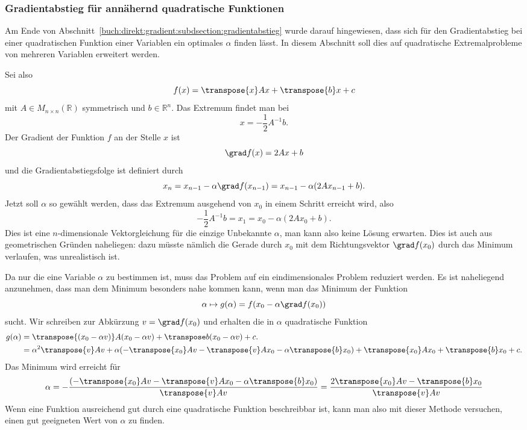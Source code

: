 %
%
\subsubsection{Gradientabstieg für annähernd quadratische Funktionen}
Am Ende von Abschnitt~\ref{buch:direkt:gradient:subdsection:gradientabstieg}
wurde darauf hingewiesen, dass sich für den Gradientabstieg bei einer
quadratischen Funktion einer Variablen ein optimales $\alpha$ finden lässt.
In diesem Abschnitt soll dies auf quadratische Extremalprobleme von
mehreren Variablen erweitert werden.

Sei also
\[
f(x)
=
\transpose{x}Ax+\transpose{b}x+c
\]
mit $A\in M_{n\times n}(\mathbb{R})$ symmetrisch und $b\in\mathbb{R}^n$.
Das Extremum findet man bei 
\[
x = -\frac12 A^{-1} b.
\]
Der Gradient der Funktion $f$ an der Stelle $x$ ist
\[
\grad f(x)
=
2Ax + b
\]
und die Gradientabstiegsfolge ist definiert durch
\[
x_n
=
x_{n-1} -\alpha \grad f(x_{n-1})
=
x_{n-1} - \alpha (2A x_{n-1} + b).
\]
Jetzt soll $\alpha$ so gewählt werden, dass das Extremum ausgehend von 
$x_0$ in einem Schritt erreicht wird, also
\[
-\frac12 A^{-1}b
=
x_1
=
x_0 - \alpha (2A x_0 + b).
\]
Dies ist eine $n$-dimensionale Vektorgleichung für die einzige Unbekannte
$\alpha$, man kann also keine Lösung erwarten.
Dies ist auch aus geometrischen Gründen naheliegen: dazu müsste nämlich
die Gerade durch $x_0$ mit dem Richtungsvektor $\grad f(x_0)$ durch das
Minimum verlaufen, was unrealistisch ist.

Da nur die eine Variable $\alpha$ zu bestimmen ist, muss das Problem auf
ein eindimensionales Problem reduziert werden.
Es ist naheliegend anzunehmen, dass man dem Minimum besonders nahe
kommen kann, wenn man das Minimum der Funktion
\[
\alpha
\mapsto
g(\alpha)
=
f(x_0 - \alpha\grad f(x_0))
\]
sucht.
Wir schreiben zur Abkürzung $v=\grad f(x_0)$ und erhalten
die in $\alpha$ quadratische Funktion
\begin{align*}
g(\alpha)
&=
\transpose{(x_0 - \alpha v)}A(x_0-\alpha v) + \transpose b(x_0-\alpha v) + c.
\\
&=
\alpha^2
\transpose{v}Av
+
\alpha
(-\transpose{x_0}Av -\transpose{v}Ax_0 -\alpha \transpose{b}x_0)
+
\transpose{x_0}Ax_0+\transpose{b}x_0 + c.
\end{align*}
Das Minimum wird erreicht für
\[
\alpha
=
-\frac{
(-\transpose{x_0}Av -\transpose{v}Ax_0 -\alpha \transpose{b}x_0)
}{
\transpose{v}Av
}
=
\frac{2\transpose{x_0}Av -\transpose{b}x_0}{\transpose{v}Av}
\]
Wenn eine Funktion ausreichend gut durch eine quadratische Funktion
beschreibbar ist, kann man also mit dieser Methode versuchen, einen gut
geeigneten Wert von $\alpha$ zu finden.



